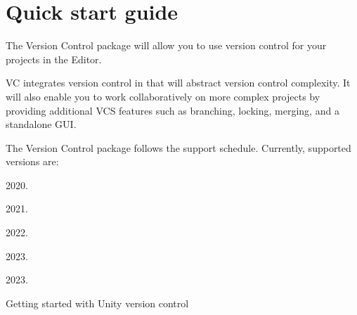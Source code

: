 \chapter{Quick start guide}
\hypertarget{md__hey_tea_9_2_library_2_package_cache_2com_8unity_8collab-proxy_0d2_80_85_2_documentation_0i_2_quick_start_guide}{}\label{md__hey_tea_9_2_library_2_package_cache_2com_8unity_8collab-proxy_0d2_80_85_2_documentation_0i_2_quick_start_guide}
\label{md__hey_tea_9_2_library_2_package_cache_2com_8unity_8collab-proxy_0d2_80_85_2_documentation_0i_2_quick_start_guide_autotoc_md889}%
%
 The Version Control package will allow you to use  version control for your projects in the  Editor.

 VC integrates version control in  that will abstract version control complexity. It will also enable you to work collaboratively on more complex projects by providing additional VCS features such as branching, locking, merging, and a standalone GUI.

The Version Control package follows the  support schedule. Currently, supported versions are\+:


\begin{DoxyItemize}
\item 2020.
\item 2021.
\item 2022.
\item 2023.
\item 2023.
\end{DoxyItemize}

Getting started with Unity version control 